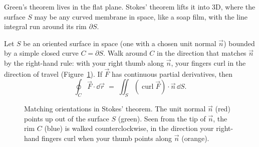 Green's theorem lives in the flat plane. Stokes' theorem lifts it into 3D, where
the surface $S$ may be any curved membrane in space, like a soap film, with the line
integral run around its rim $\partial S$.

\begin{theorem}
\label{ch35:thm-stokes}
Let $S$ be an oriented surface in space (one with a chosen unit normal $\vec n$)
bounded by a simple closed curve $C=\partial S$. Walk around $C$ in the direction
that matches $\vec n$ by the right-hand rule: with your right thumb along $\vec n$,
your fingers curl in the direction of travel
(Figure~\ref{ch35:fig-stokes-orient}). If $\vec F$ has continuous partial
derivatives, then
\[
  \oint_C \vec F\cdot\dd\vec r \;=\; \iint_S (\operatorname{curl}\vec F)\cdot\vec n\,\dd S.
\]
\end{theorem}

\begin{figure}[htbp]
\centering
{}
\caption{Matching orientations in Stokes' theorem. The unit normal $\vec n$ (red)
points up out of the surface $S$ (green). Seen from the tip of $\vec n$, the rim
$C$ (blue) is walked counterclockwise, in the direction your right-hand fingers
curl when your thumb points along $\vec n$ (orange).}
\label{ch35:fig-stokes-orient}
\end{figure}

